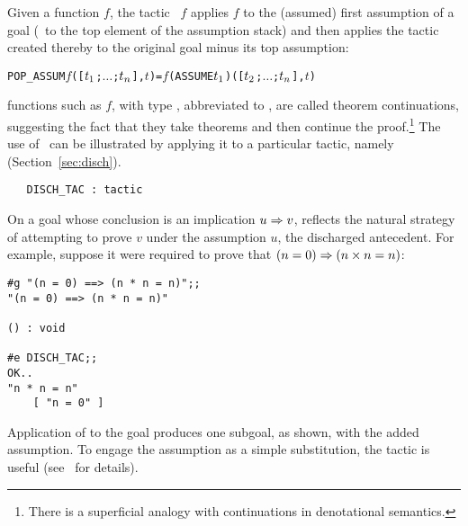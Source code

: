 \noindent Given a function $f$, the tactic
\ $f$ applies $f$ to the (assumed) first
assumption of a goal (\ie\ to the top element of the assumption stack)
and then applies the tactic created thereby to the original goal
minus its top assumption:

\begin{hol}\begin{alltt}
   POP_ASSUM \(f\) ([\(t\sb{1}\);\(\ldots\);\(t\sb{n}\)],\(t\)) = \(f\) (ASSUME \(t\sb{1}\)) ([\(t\sb{2}\);\(\ldots\);\(t\sb{n}\)],\(t\))
\end{alltt}\end{hol}

\noindent \ML{} functions such as $f$,
with type , abbreviated to ,
are called theorem continuations,
 suggesting the fact that they
take theorems and then continue the proof.\footnote{There is a superficial analogy
with continuations in denotational semantics.}
The use of \ can be illustrated by applying it
to a particular tactic, namely  (Section~\ref{sec:disch}).

\begin{holboxed}\begin{verbatim}
   DISCH_TAC : tactic
\end{verbatim}\end{holboxed}

\noindent On a goal whose conclusion is an implication $u \Rightarrow v$,
 reflects the natural strategy of attempting to prove
$v$ under the assumption $u$, the discharged antecedent.  For example,
suppose it were required to prove that $(n = 0) \Rightarrow (n\times n = n)$:

\setcounter{sessioncount}{1}
\begin{session}\begin{verbatim}
#g "(n = 0) ==> (n * n = n)";;
"(n = 0) ==> (n * n = n)"

() : void

#e DISCH_TAC;;
OK..
"n * n = n"
    [ "n = 0" ]
\end{verbatim}\end{session}

\noindent Application of  to the goal produces one subgoal,
as shown, with the added assumption. To engage the assumption
as a simple substitution, the tactic  is useful
(see \REFERENCE\ for details).


